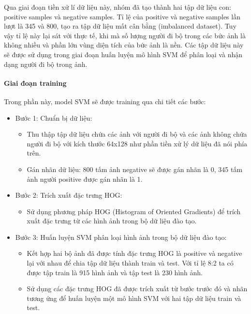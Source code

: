 Qua giai đoạn tiền xử lí dữ liệu này, nhóm đã tạo thành hai tập dữ liệu con: positive samples và negative samples. Tỉ lệ của positive và negative samples lần lượt là 345 và 800, tạo ra tập dữ liệu mất cân bằng (imbalanced dataset). Tuy vậy tỉ lệ này lại sát với thực tế, khi mà số lượng người đi bộ trong các bức ảnh là không nhiều và phần lớn vùng diện tích của bức ảnh là nền. Các tập dữ liệu này sẽ được sử dụng trong giai đoạn huấn luyện mô hình SVM để phân loại và nhận dạng người đi bộ trong ảnh.
\paragraph{Giai đoạn training\\}
Trong phần này, model SVM sẽ được training qua chi tiết các bước:
\begin{itemize}[noitemsep, topsep=0pt, leftmargin=1.25em ]
    \item Bước 1: Chuẩn bị dữ liệu:
    \begin{itemize}[noitemsep, topsep=0pt, leftmargin=1.5em, label={$-$}]
        \item Thu thập tập dữ liệu chứa các ảnh với người đi bộ và các ảnh không chứa người đi bộ với kích thước 64x128 như phần tiền xử lý dữ liệu đã nói phía trên.
        \item Gán nhãn dữ liệu: 800 tấm ảnh negative sẽ được gán nhãn là 0, 345 tấm ảnh người positive được gán nhãn là 1.
    \end{itemize}
    \item Bước 2: Trích xuất đặc trưng HOG:
    \begin{itemize}[noitemsep, topsep=0pt, leftmargin=1.5em, label={$-$}]
        \item Sử dụng phương pháp HOG (Histogram of Oriented Gradients) để trích xuất đặc trưng từ các hình ảnh trong bộ dữ liệu đào tạo.
    \end{itemize}
    \item Bước 3: Huấn luyện SVM phân loại hình ảnh trong bộ dữ liệu đào tạo:
    \begin{itemize}[noitemsep, topsep=0pt, leftmargin=1.5em, label={$-$}]
        \item Kết hợp hai bộ ảnh đã được tính đặc trưng HOG là positive và negative lại với nhau để chia tập dữ liệu thành train và test. Với tỉ lệ 8:2 ta có được tập train là 915 hình ảnh và tập test là 230 hình ảnh.
        \item Sử dụng các đặc trưng HOG đã được trích xuất từ bước trước đó và nhãn tương ứng để huấn luyện một mô hình SVM với hai tập dữ liệu train và test.
    \end{itemize}
\end{itemize}

